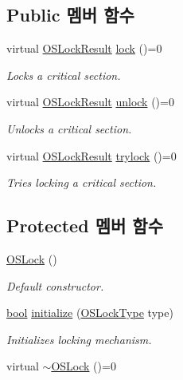 \subsection*{Public 멤버 함수}
\begin{DoxyCompactItemize}
\item 
virtual \hyperlink{avbts__oslock_8hpp_a6ade377184a937ebffbe2a94b7369a64}{O\+S\+Lock\+Result} \hyperlink{class_o_s_lock_a9186992157d223030a002f3aded7aba2}{lock} ()=0
\begin{DoxyCompactList}\small\item\em Locks a critical section. \end{DoxyCompactList}\item 
virtual \hyperlink{avbts__oslock_8hpp_a6ade377184a937ebffbe2a94b7369a64}{O\+S\+Lock\+Result} \hyperlink{class_o_s_lock_a5b965df44250112cac3cf967dc998bec}{unlock} ()=0
\begin{DoxyCompactList}\small\item\em Unlocks a critical section. \end{DoxyCompactList}\item 
virtual \hyperlink{avbts__oslock_8hpp_a6ade377184a937ebffbe2a94b7369a64}{O\+S\+Lock\+Result} \hyperlink{class_o_s_lock_ae98ef550f527786080703feace242487}{trylock} ()=0
\begin{DoxyCompactList}\small\item\em Tries locking a critical section. \end{DoxyCompactList}\end{DoxyCompactItemize}
\subsection*{Protected 멤버 함수}
\begin{DoxyCompactItemize}
\item 
\hyperlink{class_o_s_lock_ad60af4ce398c0881437648f78a4474cb}{O\+S\+Lock} ()
\begin{DoxyCompactList}\small\item\em Default constructor. \end{DoxyCompactList}\item 
\hyperlink{avb__gptp_8h_af6a258d8f3ee5206d682d799316314b1}{bool} \hyperlink{class_o_s_lock_abe9590069aa14b3a011b299110c7d50f}{initialize} (\hyperlink{avbts__oslock_8hpp_a88e6fcd587e202a0bf3d0318d8fff8bb}{O\+S\+Lock\+Type} type)
\begin{DoxyCompactList}\small\item\em Initializes locking mechanism. \end{DoxyCompactList}\item 
virtual \hyperlink{class_o_s_lock_aac6292e79b9b67d86f0a1dc57ec86319}{$\sim$\+O\+S\+Lock} ()=0
\end{DoxyCompactItemize}


